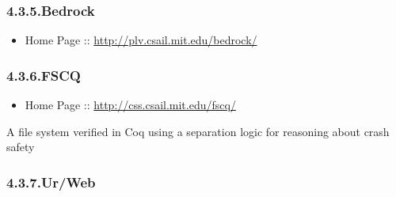 \documentclass[12pt,twoside]{article}
\begin{document}
\subsubsection{4.3.5.\hspace*{0.5em}Bedrock}\label{sec-bedrock}%

\begin{itemize}[noitemsep,topsep=\mdcompacttopsep]%

\item{}Home Page :: \href{http://plv.csail.mit.edu/bedrock/}{{\ttfamily http://\hspace{0pt}plv.\hspace{0pt}csail.\hspace{0pt}mit.\hspace{0pt}edu/\hspace{0pt}bedrock/\hspace{0pt}}}%
\end{itemize}%

\subsubsection{4.3.6.\hspace*{0.5em}FSCQ}\label{sec-fscq}%

\begin{itemize}[noitemsep,topsep=\mdcompacttopsep]%

\item{}Home Page :: \href{http://css.csail.mit.edu/fscq/}{{\ttfamily http://\hspace{0pt}css.\hspace{0pt}csail.\hspace{0pt}mit.\hspace{0pt}edu/\hspace{0pt}fscq/\hspace{0pt}}}%
\end{itemize}%

\noindent{}A file system verified in Coq using a separation logic for reasoning about crash safety%

\subsubsection{4.3.7.\hspace*{0.5em}Ur/Web}\label{sec-urweb}%
\end{document}
